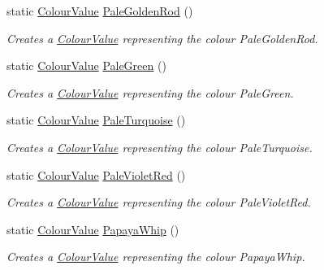 \begin{DoxyCompactItemize}
static \hyperlink{classMezzanine_1_1ColourValue}{ColourValue} \hyperlink{classMezzanine_1_1ColourValue_a49dec97bb43e8cb0f8cab94b13f15ded}{PaleGoldenRod} ()
\begin{DoxyCompactList}\small\item\em Creates a \hyperlink{classMezzanine_1_1ColourValue}{ColourValue} representing the colour PaleGoldenRod. \item\end{DoxyCompactList}\item 
static \hyperlink{classMezzanine_1_1ColourValue}{ColourValue} \hyperlink{classMezzanine_1_1ColourValue_af63fa84689a1e0831da1c47271d7d944}{PaleGreen} ()
\begin{DoxyCompactList}\small\item\em Creates a \hyperlink{classMezzanine_1_1ColourValue}{ColourValue} representing the colour PaleGreen. \item\end{DoxyCompactList}\item 
static \hyperlink{classMezzanine_1_1ColourValue}{ColourValue} \hyperlink{classMezzanine_1_1ColourValue_ac63deceef95007cb304a94523ac96ce7}{PaleTurquoise} ()
\begin{DoxyCompactList}\small\item\em Creates a \hyperlink{classMezzanine_1_1ColourValue}{ColourValue} representing the colour PaleTurquoise. \item\end{DoxyCompactList}\item 
static \hyperlink{classMezzanine_1_1ColourValue}{ColourValue} \hyperlink{classMezzanine_1_1ColourValue_a0fd1cf42d9b78bf96362ef877aac1a9f}{PaleVioletRed} ()
\begin{DoxyCompactList}\small\item\em Creates a \hyperlink{classMezzanine_1_1ColourValue}{ColourValue} representing the colour PaleVioletRed. \item\end{DoxyCompactList}\item 
static \hyperlink{classMezzanine_1_1ColourValue}{ColourValue} \hyperlink{classMezzanine_1_1ColourValue_a12ca264b5df6a66e5c8f20c7c500600f}{PapayaWhip} ()
\begin{DoxyCompactList}\small\item\em Creates a \hyperlink{classMezzanine_1_1ColourValue}{ColourValue} representing the colour PapayaWhip. \item\end{DoxyCompactList}\item 

\end{DoxyCompactItemize}
